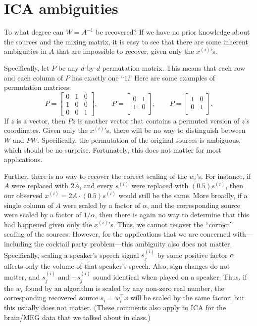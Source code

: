 \section{ICA ambiguities}
To what degree can $W = A^{-1}$ be recovered? If we have no prior knowledge
about the sources and the mixing matrix, it is easy to see that there are some
inherent ambiguities in $A$ that are impossible to recover, given only the $x^{(i)}$'s.

Specifically, let $P$ be any $d$-by-$d$ permutation matrix. This means that
each row and each column of $P$ has exactly one ``$1$.'' Here are some examples
of permutation matrices:
\[
P = \begin{bmatrix}
    0 & 1 & 0\\
    1 & 0 & 0\\
    0 & 0 & 1
\end{bmatrix}; \qquad
P = \begin{bmatrix}
    0 & 1\\
    1 & 0\\
\end{bmatrix}; \qquad
P = \begin{bmatrix}
    1 & 0\\
    0 & 1\\
\end{bmatrix}.
\]
If $z$ is a vector, then $Pz$ is another vector that contains a permuted version
of $z$'s coordinates. Given only the $x^{(i)}$'s, there will be no way to distinguish
between $W$ and $PW$. Specifically, the permutation of the original sources is
ambiguous, which should be no surprise. Fortunately, this does not matter
for most applications.

Further, there is no way to recover the correct scaling of the $w_i$'s. For
instance, if $A$ were replaced with $2A$, and every $s^{(i)}$ were replaced with $(0.5)s^{(i)}$,
then our observed $x^{(i)} = 2A \cdot (0.5)s^{(i)}$ would still be the same. More broadly,
if a single column of $A$ were scaled by a factor of $\alpha$, and the corresponding
source were scaled by a factor of $1/\alpha$, then there is again no way to determine
that this had happened given only the $x^{(i)}$'s. Thus, we cannot recover the
``correct'' scaling of the sources. However, for the applications that we are
concerned with---including the cocktail party problem---this ambiguity also
does not matter. Specifically, scaling a speaker's speech signal $s^{(i)}_j$
by some positive factor $\alpha$ affects only the volume of that speaker's speech. Also, sign
changes do not matter, and $s^{(i)}_j$
and $-s^{(i)}_j$ sound identical when played on a
speaker. Thus, if the $w_i$ found by an algorithm is scaled by any non-zero real
number, the corresponding recovered source $s_i = w^\top_i x$ will be scaled by the
same factor; but this usually does not matter. (These comments also apply
to ICA for the brain/MEG data that we talked about in class.)

